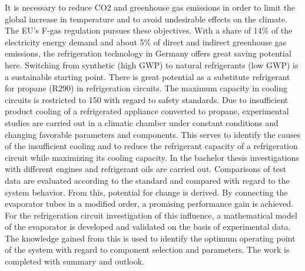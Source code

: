 It is necessary to reduce CO2 and greenhouse gas emissions in order to limit the global increase in temperature and to avoid undesirable effects on the climate. The EU's F-gas regulation pursues these objectives. With a share of \unit{14}{\%} of the electricity energy demand and about \unit{5}{\%} of direct and indirect greenhouse gas emissions, the refrigeration technology in Germany offers great saving potential here. Switching from synthetic (high GWP) to natural refrigerants (low GWP) is a sustainable starting point.
There is great potential as a substitute refrigerant for propane (R290) in refrigeration circuits. The maximum capacity in cooling circuits is restricted to \unit{150}{\gram} with regard to safety standards.
Due to insufficient product cooling of a refrigerated appliance converted to propane, experimental studies are carried out in a climatic chamber under constant conditions and changing favorable parameters and components. This serves to identify the causes of the insufficient cooling and to reduce the refrigerant capacity of a refrigeration circuit while maximizing its cooling capacity.
In the bachelor thesis investigations with different engines and refrigerant oils are carried out. Comparisons of test data are evaluated according to the standard and compared with regard to the system behavior. From this, potential for change is derived.
By connecting the evaporator tubes in a modified order, a promising performance gain is achieved. For the refrigeration circuit investigation of this influence, a mathematical model of the evaporator is developed and validated on the basis of experimental data.
The knowledge gained from this is used to identify the optimum operating point of the system with regard to component selection and parameters.
The work is completed with summary and outlook.

